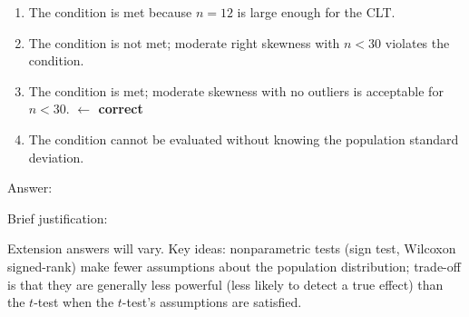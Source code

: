 \documentclass[10pt]{article}
\begin{document}
\begin{enumerate}
\begin{enumerate}[label=(\Alph*)]
  \item The condition is met because $n = 12$ is large enough for the CLT.
  \item The condition is not met; moderate right skewness with $n < 30$ violates the condition.
  \item The condition is met; moderate skewness with no outliers is acceptable for $n < 30$. \textcolor{keyred}{\textbf{$\leftarrow$ correct}}
  \item The condition cannot be evaluated without knowing the population standard deviation.
\end{enumerate}
Answer: 

Brief justification: \gradedkeyline{\gradedblank[id=hw4b, type=rubric, points=1, display={$n < 30$: moderate skew with no outliers is acceptable}]{\linewidth+6pt}{0.19in}}

\end{enumerate}

\begin{extensionbox}
Extension answers will vary. Key ideas: nonparametric tests (sign test, Wilcoxon signed-rank)
make fewer assumptions about the population distribution; trade-off is that they are generally
less powerful (less likely to detect a true effect) than the $t$-test when the $t$-test's
assumptions are satisfied.
\end{extensionbox}
\end{document}
